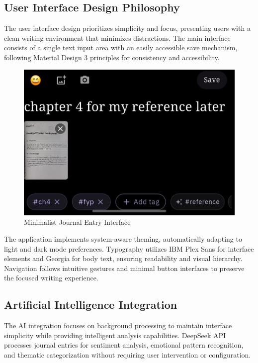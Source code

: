 \documentclass[conference]{IEEEtran}
\begin{document}
\subsection{User Interface Design Philosophy}

The user interface design prioritizes simplicity and focus, presenting users with a clean writing environment that minimizes distractions. The main interface consists of a single text input area with an easily accessible save mechanism, following Material Design 3 principles for consistency and accessibility.

\begin{figure}[H]
\centering
\includegraphics[width=0.45\columnwidth]{journal_input_basic.jpeg}
\caption{Minimalist Journal Entry Interface}
\label{fig:journal-interface}
\end{figure}

The application implements system-aware theming, automatically adapting to light and dark mode preferences. Typography utilizes IBM Plex Sans for interface elements and Georgia for body text, ensuring readability and visual hierarchy. Navigation follows intuitive gestures and minimal button interfaces to preserve the focused writing experience.

\subsection{Artificial Intelligence Integration}

The AI integration focuses on background processing to maintain interface simplicity while providing intelligent analysis capabilities. DeepSeek API processes journal entries for sentiment analysis, emotional pattern recognition, and thematic categorization without requiring user intervention or configuration.
\end{document}
